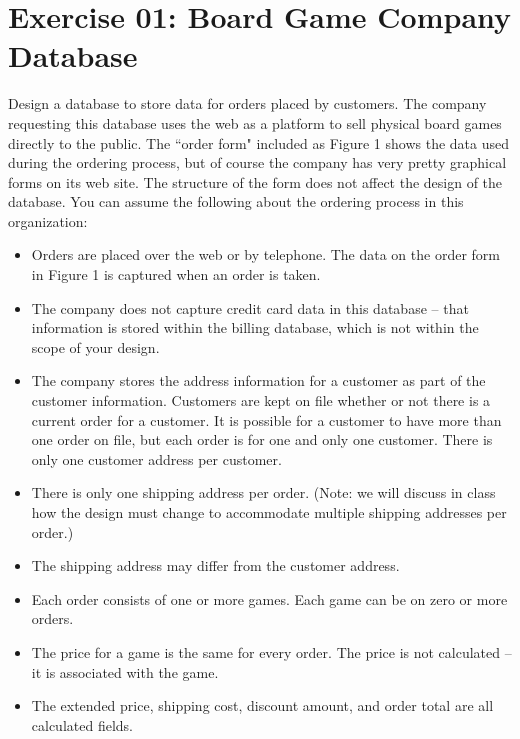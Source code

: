 \documentclass{article}
\begin{document}
\section{Exercise 01: Board Game Company Database}
Design a database to store data for orders placed by customers. The company requesting this database uses the web as a platform to sell physical board games directly to the public. The ``order form" included as Figure 1 shows the data used during the ordering process, but of course the company has very pretty graphical forms on its web site. The structure of the form does not affect the design of the database. You can assume the following about the ordering process in this organization:
\begin{itemize}
  \item Orders are placed over the web or by telephone. The data on the order form in Figure 1 is captured when an order is taken.
  
  \item The company does not capture credit card data in this database – that information is stored within the billing database, which is not within the scope of your design.
  
  \item The company stores the address information for a customer as part of the customer information. Customers are kept on file whether or not there is a current order for a customer. It is possible for a customer to have more than one order on file, but each order is for one and only one customer. There is only one customer address per customer.
  
  \item There is only one shipping address per order. (Note: we will discuss in class how the design must change to accommodate multiple shipping addresses per order.)
  
  \item The shipping address may differ from the customer address.
  
  \item Each order consists of one or more games. Each game can be on zero or more orders.
  
  \item The price for a game is the same for every order. The price is not calculated – it is associated with the game.
  
  \item The extended price, shipping cost, discount amount, and order total are all calculated fields.
  

\end{itemize}
\end{document}
